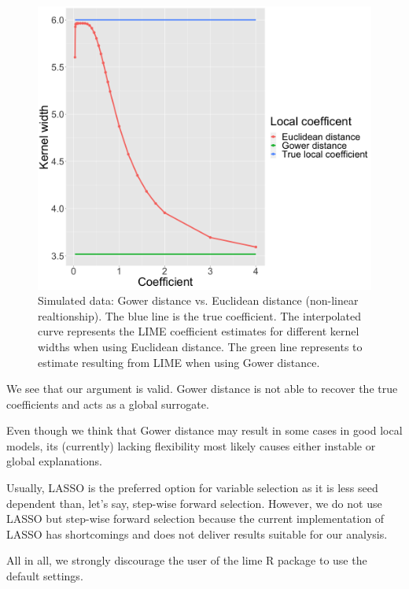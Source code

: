 \documentclass[]{krantz}
\begin{document}
\begin{figure}

{\centering \includegraphics[width=0.99\linewidth]{images/04-09-16} 

}

\caption{Simulated data: Gower distance vs. Euclidean distance (non-linear realtionship). The blue line is the true coefficient. The interpolated curve represents the LIME coefficient estimates for different kernel widths when using Euclidean distance. The green line represents to estimate resulting from LIME when using Gower distance.}\label{fig:lime-fig15}
\end{figure}

We see that our argument is valid. Gower distance is not able to recover
the true coefficients and acts as a global surrogate.

Even though we think that Gower distance may result in some cases in
good local models, its (currently) lacking flexibility most likely
causes either instable or global explanations.

Usually, LASSO is the preferred option for variable selection as it is
less seed dependent than, let's say, step-wise forward selection.
However, we do not use LASSO but step-wise forward selection because the
current implementation of LASSO has shortcomings and does not deliver
results suitable for our analysis.

All in all, we strongly discourage the user of the lime R package to use
the default settings.
\end{document}
